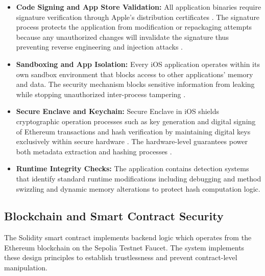 \begin{itemize}
    \item {\textbf{Code Signing and App Store Validation: }} All application binaries require signature verification through Apple’s distribution certificates \cite{devCert}. 
    The signature process protects the application from modification or repackaging attempts because any unauthorized changes will invalidate the signature thus preventing reverse engineering and injection attacks \cite{iosSecGarg} \cite{benenson2013}.
    \item {\textbf{Sandboxing and App Isolation: }} Every iOS application operates within its own sandbox environment that blocks access to other applications' memory and data. The security mechanism blocks sensitive information from leaking while stopping unauthorized inter-process tampering \cite{iosSecGarg}.
    \item {\textbf{Secure Enclave and Keychain: }} Secure Enclave in iOS shields cryptographic operation processes such as key generation and digital signing of Ethereum transactions and hash verification by maintaining digital keys exclusively within secure hardware \cite{SecureEnclave2024}. The hardware-level guarantees power both metadata extraction and hashing processes \cite{benenson2013}.
    \item {\textbf{Runtime Integrity Checks: }} The application contains detection systems that identify standard runtime modifications including debugging and method swizzling and dynamic memory alterations to protect hash computation logic.
\end{itemize}

\subsection{Blockchain and Smart Contract Security}
The Solidity smart contract implements backend logic which operates from the Ethereum blockchain on the Sepolia Testnet Faucet. 
The system implements these design principles to establish trustlessness and prevent contract-level manipulation.

